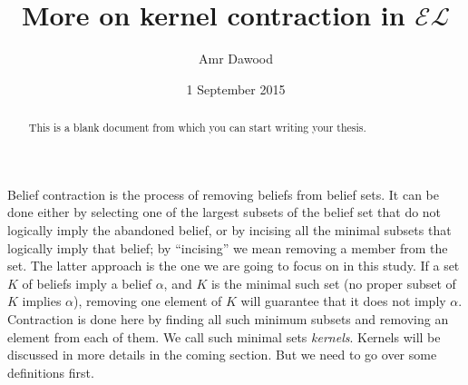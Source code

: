\documentclass{sfuthesis}
\title{More on kernel contraction in $\mathcal{EL}$}
\author{Amr Dawood}
\date{1 September 2015}
\theoremstyle{plain}
\theoremstyle{definition}
\begin{document}
\frontmatter
\maketitle{}
\makecommittee{}

\begin{abstract}
	This is a blank document from which you can start writing your thesis.
\end{abstract}


\begin{dedication} %
\end{dedication}


\begin{acknowledgements} %
\end{acknowledgements}

\tableofcontents\clearpage
{}\listoftables\clearpage
{}\listoffigures





%
%

\mainmatter%









\label{kernel}
Belief contraction is the process of removing beliefs from belief sets. It can be done either by selecting one  of the largest subsets of the belief set that do not logically imply the abandoned belief, or by incising all the minimal subsets that logically imply that belief; by ``incising'' we mean removing a member from the set. The latter approach is the one we are going to focus on in this study. If a set $K$ of beliefs imply a belief $\alpha$, and $K$ is the minimal such set (no proper subset of $K$ implies $\alpha$), removing one element of $K$ will guarantee that it does not imply $\alpha$. Contraction is done here by finding all such minimum subsets and removing an element from each of them. We call such minimal sets \textit{kernels}. Kernels will be discussed in more details in the coming section. But we need to go over some definitions first.
\end{document}

